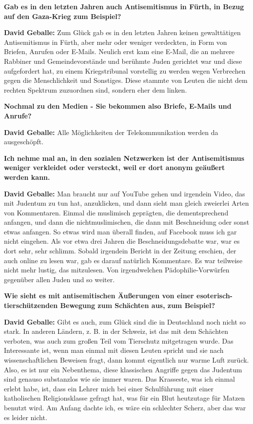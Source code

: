\textbf{Gab es in den letzten Jahren auch Antisemitismus in Fürth, in Bezug auf den Gaza-Krieg zum Beispiel?} 

\textbf{David Geballe:} Zum Glück gab es in den letzten Jahren keinen gewalttätigen Antisemitismus in Fürth, aber mehr oder weniger verdeckten, in Form von Briefen, Anrufen oder E-Mails. Neulich erst kam eine E-Mail, die an mehrere Rabbiner und Gemeindevorstände und berühmte Juden gerichtet war und diese aufgefordert hat, zu einem Kriegstribunal vorstellig zu werden wegen Verbrechen gegen die Menschlichkeit und Sonstiges. Diese stammte von Leuten die nicht dem rechten Spektrum zuzuordnen sind, sondern eher dem linken. 

\textbf{Nochmal zu den Medien - Sie bekommen also Briefe, E-Mails und Anrufe?} 

\textbf{David Geballe:} Alle Möglichkeiten der Telekommunikation werden da ausgeschöpft. 

\textbf{Ich nehme mal an, in den sozialen Netzwerken ist der Antisemitismus weniger verkleidet oder versteckt, weil er dort anonym geäußert werden kann.} 

\textbf{David Geballe:} Man braucht nur auf YouTube gehen und irgendein Video, das mit Judentum zu tun hat, anzuklicken, und dann sieht man gleich zweierlei Arten von Kommentaren. Einmal die muslimisch geprägten, die dementsprechend anfangen, und dann die nichtmuslimischen, die dann mit Beschneidung oder sonst etwas anfangen. So etwas wird man überall finden, auf Facebook muss ich gar nicht eingehen. Als vor etwa drei Jahren die Beschneidungsdebatte war, war es dort sehr, sehr schlimm. Sobald irgendein Bericht in der Zeitung erschien, der auch online zu lesen war, gab es darauf natürlich Kommentare. Es war teilweise nicht mehr lustig, das mitzulesen. Von irgendwelchen Pädophilie-Vorwürfen gegenüber allen Juden und so weiter. 

\textbf{Wie sieht es mit antisemitischen Äußerungen von einer esoterisch-tierschützenden Bewegung zum Schächten aus, zum Beispiel?}

\textbf{David Geballe:} Gibt es auch, zum Glück sind die in Deutschland noch nicht so stark. In anderen Ländern, z. B. in der Schweiz, ist das mit dem Schächten verboten, was auch zum großen Teil vom Tierschutz mitgetragen wurde. Das Interessante ist, wenn man einmal mit diesen Leuten spricht und sie nach wissenschaftlichen Beweisen fragt, dann kommt eigentlich nur warme Luft zurück. Also, es ist nur ein Nebenthema, diese klassischen Angriffe gegen das Judentum sind genauso substanzlos wie sie immer waren. Das Krasseste, was ich einmal erlebt habe, ist, dass ein Lehrer mich bei einer Schulführung mit einer katholischen Religionsklasse gefragt hat, was für ein Blut heutzutage für Matzen benutzt wird. Am Anfang dachte ich, es wäre ein schlechter Scherz, aber das war es leider nicht. 

